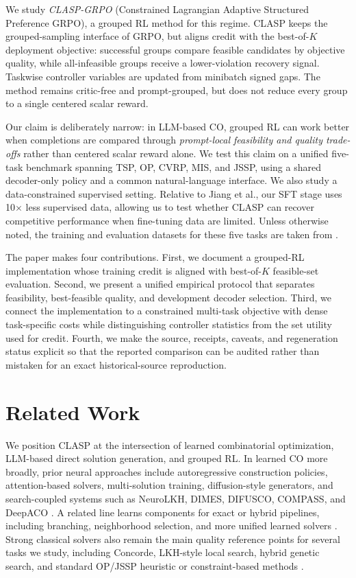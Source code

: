 \documentclass{article}
\theoremstyle{remark}
\begin{document}
We study \emph{CLASP-GRPO} (Constrained Lagrangian Adaptive Structured Preference GRPO), a grouped RL method for this regime. CLASP keeps the grouped-sampling interface of GRPO, but aligns credit with the best-of-\(K\) deployment objective: successful groups compare feasible candidates by objective quality, while all-infeasible groups receive a lower-violation recovery signal. Taskwise controller variables are updated from minibatch signed gaps. The method remains critic-free and prompt-grouped, but does not reduce every group to a single centered scalar reward.

Our claim is deliberately narrow: in LLM-based CO, grouped RL can work better when completions are compared through \emph{prompt-local feasibility and quality trade-offs} rather than centered scalar reward alone. We test this claim on a unified five-task benchmark spanning TSP, OP, CVRP, MIS, and JSSP, using a shared decoder-only policy and a common natural-language interface. We also study a data-constrained supervised setting. Relative to Jiang et al., our SFT stage uses 10\(\times\) less supervised data, allowing us to test whether CLASP can recover competitive performance when fine-tuning data are limited. Unless otherwise noted, the training and evaluation datasets for these five tasks are taken from \citet{jiang2025endtoendco}.

The paper makes four contributions. First, we document a grouped-RL implementation whose training credit is aligned with best-of-\(K\) feasible-set evaluation. Second, we present a unified empirical protocol that separates feasibility, best-feasible quality, and development decoder selection. Third, we connect the implementation to a constrained multi-task objective with dense task-specific costs while distinguishing controller statistics from the set utility used for credit. Fourth, we make the source, receipts, caveats, and regeneration status explicit so that the reported comparison can be audited rather than mistaken for an exact historical-source reproduction.
\section{Related Work}
We position CLASP at the intersection of learned combinatorial optimization, LLM-based direct solution generation, and grouped RL. In learned CO more broadly, prior neural approaches include autoregressive construction policies, attention-based solvers, multi-solution training, diffusion-style generators, and search-coupled systems such as NeuroLKH, DIMES, DIFUSCO, COMPASS, and DeepACO \citep{bengio2020ml4co, vinyals2015pointer, kool2019attention, kwon2020pomo, xin2021neurolkh, qiu2022dimes, sun2023difusco, chalumeau2023compass, ye2023deepaco}. A related line learns components for exact or hybrid pipelines, including branching, neighborhood selection, and more unified learned solvers \citep{gasse2019exact, wu2021l2lns, wang2021bilevel, liu2024l2pmip, drakulic2025goal, pan2025unico}. Strong classical solvers also remain the main quality reference points for several tasks we study, including Concorde, LKH-style local search, hybrid genetic search, and standard OP/JSSP heuristic or constraint-based methods \citep{applegate2006tsp, helsgaun2017lkh3, vidal2022hgs, vansteenwegen2011op}.
\end{document}
